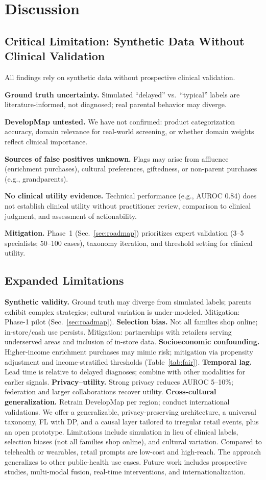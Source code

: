 \documentclass[conference]{IEEEtran}
\theoremstyle{plain}
\theoremstyle{remark}
\begin{document}
\section{Discussion}
\subsection*{Critical Limitation: Synthetic Data Without Clinical Validation}
All findings rely on synthetic data without prospective clinical validation.

\textbf{Ground truth uncertainty.}
Simulated ``delayed'' vs.\ ``typical'' labels are literature-informed, not diagnosed; real parental behavior may diverge.

\textbf{DevelopMap untested.}
We have not confirmed: product categorization accuracy, domain relevance for real-world screening, or whether domain weights reflect clinical importance.

\textbf{Sources of false positives unknown.}
Flags may arise from affluence (enrichment purchases), cultural preferences, giftedness, or non-parent purchases (e.g., grandparents).

\textbf{No clinical utility evidence.}
Technical performance (e.g., AUROC 0.84) does not establish clinical utility without practitioner review, comparison to clinical judgment, and assessment of actionability.

\textbf{Mitigation.}
Phase~1 (Sec.~\ref{sec:roadmap}) prioritizes expert validation (3--5 specialists; 50--100 cases), taxonomy iteration, and threshold setting for clinical utility.

\subsection*{Expanded Limitations}
\textbf{Synthetic validity.} Ground truth may diverge from simulated labels; parents exhibit complex strategies; cultural variation is under-modeled. Mitigation: Phase-1 pilot (Sec.~\ref{sec:roadmap}).
\textbf{Selection bias.} Not all families shop online; in-store/cash use persists. Mitigation: partnerships with retailers serving underserved areas and inclusion of in-store data.
\textbf{Socioeconomic confounding.} Higher-income enrichment purchases may mimic risk; mitigation via propensity adjustment and income-stratified thresholds (Table~\ref{tab:fair}).
\textbf{Temporal lag.} Lead time is relative to delayed diagnoses; combine with other modalities for earlier signals.
\textbf{Privacy--utility.} Strong privacy reduces AUROC 5--10\%; federation and larger collaborations recover utility.
\textbf{Cross-cultural generalization.} Retrain DevelopMap per region; conduct international validations.
\label{sec:discussion}
We offer a generalizable, privacy-preserving architecture, a universal taxonomy, FL with DP, and a causal layer tailored to irregular retail events, plus an open prototype. Limitations include simulation in lieu of clinical labels, selection biases (not all families shop online), and cultural variation. Compared to telehealth or wearables, retail prompts are low-cost and high-reach. The approach generalizes to other public-health use cases. Future work includes prospective studies, multi-modal fusion, real-time interventions, and internationalization.
\end{document}

